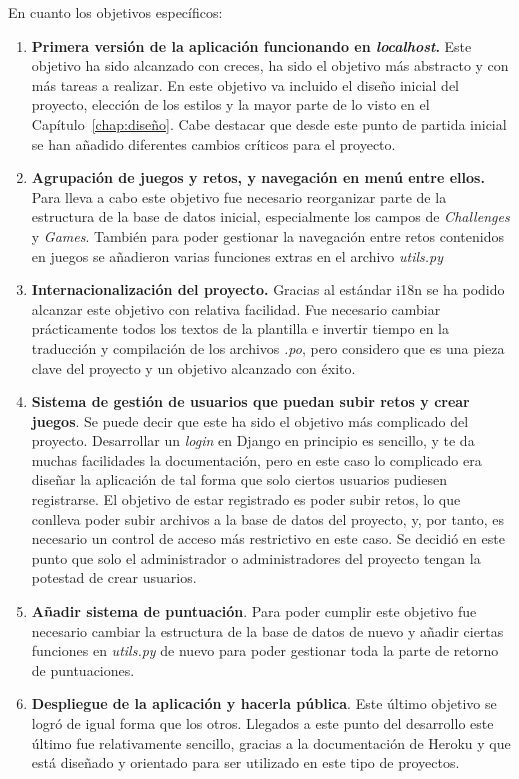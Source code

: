 \documentclass[a4paper, 12pt]{book}
\begin{document}
En cuanto los objetivos específicos: 
\begin{enumerate}
	\item \textbf{Primera versión de la aplicación funcionando en \emph{localhost}.} Este objetivo ha sido alcanzado con creces, ha sido el objetivo más abstracto y con más tareas a realizar. En este objetivo va incluido el diseño inicial del proyecto, elección de los estilos y la mayor parte de lo visto en el Capítulo~\ref{chap:diseño}. Cabe destacar que desde este punto de partida inicial se han añadido diferentes cambios críticos para el proyecto.
	\item \textbf{Agrupación de juegos y retos, y navegación en menú entre ellos.} Para lleva a cabo este objetivo fue necesario reorganizar parte de la estructura de la base de datos inicial, especialmente los campos de \emph{Challenges} y \emph{Games}. También para poder gestionar la navegación entre retos contenidos en juegos se añadieron varias funciones extras en el archivo \emph{utils.py}
	\item \textbf{Internacionalización del proyecto.} Gracias al estándar i18n se ha podido alcanzar este objetivo con relativa facilidad. Fue necesario cambiar prácticamente todos los textos de la plantilla e invertir tiempo en la traducción y compilación de los archivos \emph{.po}, pero considero que es una pieza clave del proyecto y un objetivo alcanzado con éxito.
	\item \textbf{Sistema de gestión de usuarios que puedan subir retos y crear juegos}. Se puede decir que este ha sido el objetivo más complicado del proyecto. Desarrollar un \emph{login} en Django en principio es sencillo, y te da muchas facilidades la documentación, pero en este caso lo complicado era diseñar la aplicación de tal forma que solo ciertos usuarios pudiesen registrarse. El objetivo de estar registrado es poder subir retos, lo que conlleva poder subir archivos a la base de datos del proyecto, y, por tanto, es necesario un control de acceso más restrictivo en este caso. Se decidió en este punto que solo el administrador o administradores del proyecto tengan la potestad de crear usuarios. 
	\item \textbf{Añadir sistema de puntuación}. Para poder cumplir este objetivo fue necesario cambiar la estructura de la base de datos de nuevo y añadir ciertas funciones en \emph{utils.py} de nuevo para poder gestionar toda la parte de retorno de puntuaciones.  
	\item \textbf{Despliegue de la aplicación y hacerla pública}. Este último objetivo se logró de igual forma que los otros. Llegados a este punto del desarrollo este último fue relativamente sencillo, gracias a la documentación de Heroku y que está diseñado y orientado para ser utilizado en  este tipo de proyectos.  
\end{enumerate}
\end{document}
